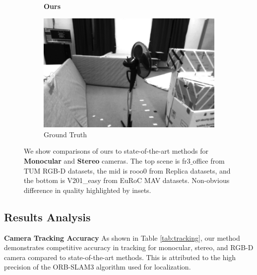 \begin{figure}[ht]
\begin{subfigure}[ht]{0.24\linewidth}
        \caption{{\bf Ours}}
        \label{fig:gull}
    \end{subfigure}
    \begin{subfigure}[ht]{0.24\linewidth}
        \includegraphics[width=1\linewidth]{fig/fig_mono/euroc/GT/30000_1827.jpg}
        \caption{Ground Truth}
        \label{fig:gull}
    \end{subfigure}
	\caption{We show comparisons of ours to state-of-the-art methods for \textbf{Monocular} and \textbf{Stereo}  cameras. The top scene is fr3$\_$office from TUM RGB-D datasets, the mid is rooo0 from Replica datasets, and the bottom is V201\_easy from EuRoC MAV datasets. Non-obvious difference in quality highlighted by insets.}
	\label{fig:rendering_mono_stereo}
\end{figure}





\subsection{Results Analysis}
\textbf{Camera Tracking Accuracy}
As shown in Table \ref{tab:tracking}, our method demonstrates competitive accuracy in tracking for monocular, stereo, and RGB-D camera compared to state-of-the-art methods. This is attributed to the high precision of the ORB-SLAM3 \cite{ORB-SLAM32021} algorithm used for localization.




